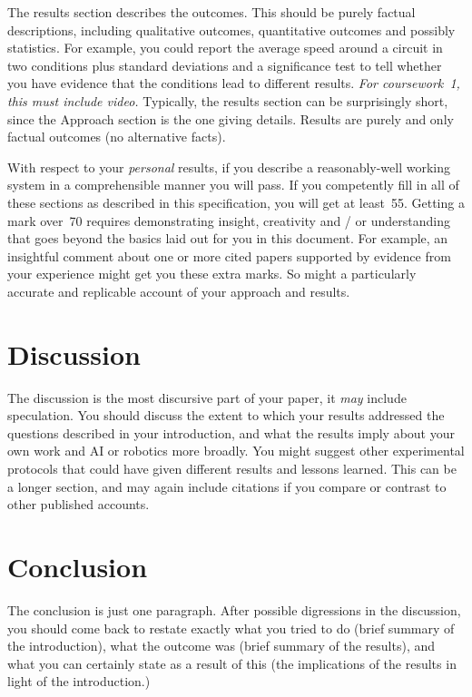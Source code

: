 \documentclass[a4paper,12pt]{article}
\begin{document}
The results section describes the outcomes.  This should be purely
factual descriptions, including qualitative outcomes, quantitative
outcomes and possibly statistics.  For example, you could report the
average speed around a circuit in two conditions plus standard
deviations and a significance test to tell whether you have evidence
that the conditions lead to different results. {\em For coursework~1, this
must include video.}  Typically, the results section can be
surprisingly short, since the Approach section is the one giving
details. Results are purely and only factual outcomes (no alternative facts).

With respect to your {\em personal} results, if you describe a reasonably-well
working system in a comprehensible manner you will pass.  If you
competently fill in all of these sections as described in this
specification, you will get at least~55.  Getting a mark over~70
requires demonstrating insight, creativity and / or understanding that
goes beyond the basics laid out for you in this document.  For
example, an insightful comment about one or more cited papers
supported by evidence from your experience might get you these extra
marks.  So might a particularly accurate and replicable account of
your approach and results.

\section{Discussion}

The discussion is the most discursive part of your paper, it {\em may}
include speculation. You should discuss the extent to which your
results addressed the questions described in your introduction, and
what the results imply about your own work and AI or robotics more broadly.  You
might suggest other experimental protocols that could have given
different results and lessons learned.  This can be a longer section,
and may again include citations if you compare or contrast to other
published accounts.


\section{Conclusion}
The conclusion is just one paragraph.  After possible digressions in
the discussion, you should come back to restate exactly what you tried
to do (brief summary of the introduction), what the outcome was (brief
summary of the results), and what you can certainly state as a
result of this (the implications of the results in light of the introduction.)



\end{document}
